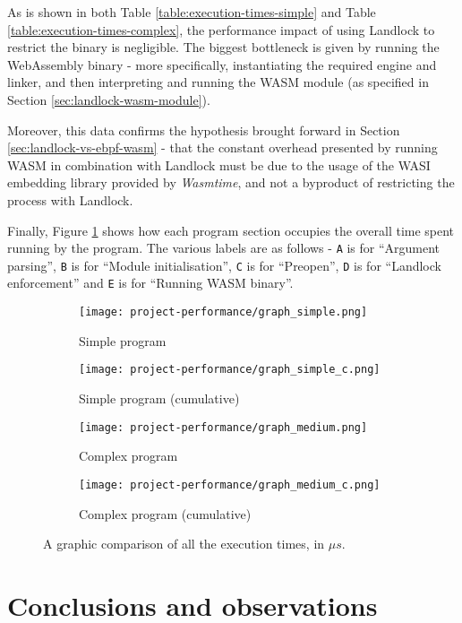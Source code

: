 As is shown in both Table \ref{table:execution-times-simple} and Table \ref{table:execution-times-complex},
the performance impact of using Landlock to restrict the binary is negligible.
The biggest bottleneck is given by running the WebAssembly binary - more specifically, instantiating
the required engine and linker, and then interpreting and running the WASM module (as specified in Section \ref{sec:landlock-wasm-module}).

Moreover, this data confirms the hypothesis brought forward in Section \ref{sec:landlock-vs-ebpf-wasm} - that
the constant overhead presented by running WASM in combination with Landlock must be due to the usage of
the WASI embedding library provided by \textit{Wasmtime}, and not a byproduct of restricting the process with Landlock.

Finally, Figure \ref{fig:perf-execution-times-comparison} shows how each program section
occupies the overall time spent running by the program. The various labels are as follows
- \texttt{A} is for ``Argument parsing'', \texttt{B} is for ``Module initialisation'',
\texttt{C} is for ``Preopen'', \texttt{D} is for ``Landlock enforcement'' and
\texttt{E} is for ``Running WASM binary''.

\begin{figure}[ht!]
  \centering
  
  \begin{subfigure}[b]{0.46\textwidth}
    \texttt{[image: project-performance/graph\_simple.png]}
    \caption{Simple program}
  \end{subfigure}
  \begin{subfigure}[b]{0.46\textwidth}
    \texttt{[image: project-performance/graph\_simple\_c.png]}
    \caption{Simple program (cumulative)}
  \end{subfigure}

  \begin{subfigure}[b]{0.46\textwidth}
    \texttt{[image: project-performance/graph\_medium.png]}
    \caption{Complex program}
  \end{subfigure}
  \begin{subfigure}[b]{0.46\textwidth}
    \texttt{[image: project-performance/graph\_medium\_c.png]}
    \caption{Complex program (cumulative)}
  \end{subfigure}

  \caption{A graphic comparison of all the execution times, in $\mu s$.}
  \label{fig:perf-execution-times-comparison}
\end{figure}

\section{Conclusions and observations}